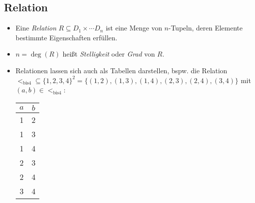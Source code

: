 \documentclass[a4paper, 11pt, accentcolor = tud3b]{tudreport}
\begin{document}
            \subsection{Relation} %
                \begin{itemize}
                	\item Eine \textit{Relation} \( R \subseteq D _ 1 \times \cdots D _ n \) ist eine Menge von \(n\)-Tupeln, deren Elemente bestimmte Eigenschaften erfüllen.
                	\item \( n = \deg(R) \) heißt \textit{Stelligkeit} oder \textit{Grad} von \(R\).
                	\item Relationen lassen sich auch als Tabellen darstellen, bspw. die Relation \( < _ \text{bis4} \subseteq \{ 1, 2, 3, 4 \} ^ 2 = \{ (1, 2), (1, 3), (1, 4), (2, 3), (2, 4), (3, 4) \} \) mit \( (a, b) \in < _ \text{bis4} \):
                		\begin{table}[H]
                			\centering
                			\begin{tabular}{c | c}
                				\(a\) & \(b\) \\ \hline
                				  1   & 2     \\
                				  1   & 3     \\
                				  1   & 4     \\
                				  2   & 3     \\
                				  2   & 4     \\
                				  3   & 4
                			\end{tabular}
                		\end{table}
                \end{itemize}
\end{document}

